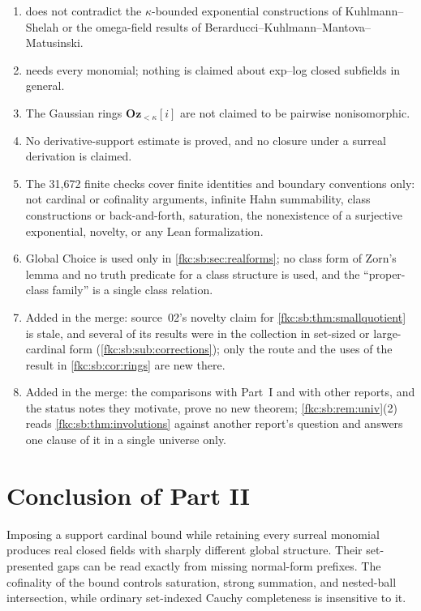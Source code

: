 \documentclass[11pt,letterpaper]{article}
\numberwithin{equation}{section}
\theoremstyle{definition}
\theoremstyle{remark}
\newcommand{\Oz}{\mathbf{Oz}}
\newcommand{\Ok}{\Oz_{<\kappa}}
\begin{document}
\begin{enumerate}[label=\textup{N\arabic*.}, leftmargin=2.8em, start=13]
\item {} does not contradict the $\kappa$-bounded exponential constructions of Kuhlmann--Shelah or the omega-field results of Berarducci--Kuhlmann--Mantova--Matusinski.
\item {} needs every monomial; nothing is claimed about exp--log closed subfields in general.
\item The Gaussian rings $\Ok[i]$ are not claimed to be pairwise nonisomorphic.
\item No derivative-support estimate is proved, and no closure under a surreal derivation is claimed.
\item The 31,672 finite checks cover finite identities and boundary conventions only: not cardinal or cofinality arguments, infinite Hahn summability, class constructions or back-and-forth, saturation, the nonexistence of a surjective exponential, novelty, or any Lean formalization.
\item Global Choice is used only in \cref{fkc:sb:sec:realforms}; no class form of Zorn's lemma and no truth predicate for a class structure is used, and the ``proper-class family'' is a single class relation.
\item Added in the merge: source~02's novelty claim for \cref{fkc:sb:thm:smallquotient} is stale, and several of its results were in the collection in set-sized or large-cardinal form (\cref{fkc:sb:sub:corrections}); only the route and the uses of the result in \cref{fkc:sb:cor:rings} are new there.
\item Added in the merge: the comparisons with Part~I and with other reports, and the status notes they motivate, prove no new theorem; \cref{fkc:sb:rem:univ}(2) reads \cref{fkc:sb:thm:involutions} against another report's question and answers one clause of it in a single universe only.
\end{enumerate}

\section{Conclusion of Part II}\label{fkc:sb:sec:conclusion}

Imposing a support cardinal bound while retaining every surreal monomial produces real closed fields with sharply different global structure. Their set-presented gaps can be read exactly from missing normal-form prefixes. The cofinality of the bound controls saturation, strong summation, and nested-ball intersection, while ordinary set-indexed Cauchy completeness is insensitive to it.
\end{document}
